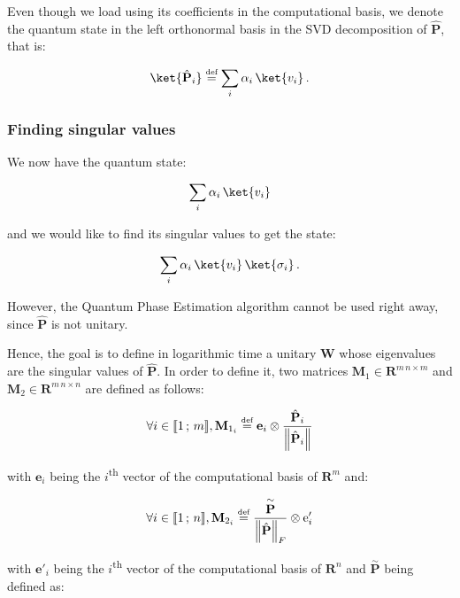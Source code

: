 \documentclass[11pt, a4paper]{article}
\begin{document}
                Even though we load  using its coefficients in the computational basis, we denote the quantum state in the left orthonormal basis in the SVD decomposition of \(\hat{\mathbf{P}}\), that is:
                
                \[\ket{\hat{\mathbf{P}}_i} \overset{\text{\tiny{def}}}{=} \sum_{i}\alpha_i\,\ket{v_i}\,.\]
                
            \subsubsection{Finding singular values}
                We now have the quantum state:
                
                \[\sum_{i}\alpha_i\,\ket{v_i}\]
                
                and we would like to find its singular values to get the state:
                
                \[\sum_{i}\alpha_i\,\ket{v_i}\,\ket{\sigma_i}\,.\]
                
                However, the Quantum Phase Estimation algorithm cannot be used right away, since \(\hat{\mathbf{P}}\) is not unitary.
                
                Hence, the goal is to define in logarithmic time a unitary \(\mathbf{W}\) whose eigenvalues are the singular values of \(\hat{\mathbf{P}}\). In order to define it, two matrices \(\mathbf{M}_1\in\mathbf{R}^{m\,n\times m}\) and \(\mathbf{M}_2\in\mathbf{R}^{m\,n\times n}\) are defined as follows:
                
                \[\forall i\in\llbracket1\,;\,m\rrbracket,\mathbf{M}_{1_i}\overset{\text{\tiny{def}}}{=}\mathbf{e}_i\otimes\frac{\hat{\mathbf{P}}_i}{\left\|\hat{\mathbf{P}}_i\right\|}\]
                
                with \(\mathbf{e}_i\) being the \(i\)\textsuperscript{th} vector of the computational basis of \(\mathbf{R}^{m}\) and:
                
                \[\forall i\in\llbracket1\,;\,n\rrbracket,\mathbf{M}_{2_i}\overset{\text{\tiny{def}}}{=}\frac{\overset{\sim}{\mathbf{P}}}{\left\|\hat{\mathbf{P}}\right\|_F}\otimes\mathrm{e}'_i\]
                
                with \(\mathbf{e}'_i\) being the \(i\)\textsuperscript{th} vector of the computational basis of \(\mathbf{R}^{n}\) and \(\overset{\sim}{\mathbf{P}}\) being defined as:
                
\end{document}
